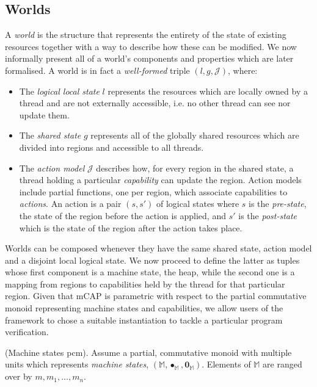 \subsection{Worlds} \label{worlds}

A \textit{world} is the structure that represents the entirety of the state of existing resources together with a way to describe how these can be modified. We now informally present all of a world's components and properties which are later formalised. A world is in fact a \textit{well-formed} triple $(l, g, \mathcal{J})$, where:
\begin{itemize}
	\item The \textit{logical local state} $l$ represents the resources which are locally owned by a thread and are not externally accessible, i.e. no other thread can see nor update them.
	\item The \textit{shared state} $g$ represents all of the globally shared resources which are divided into regions and accessible to all threads.
	\item The \textit{action model} $\mathcal{J}$ describes how, for every region in the shared state, a thread holding a particular \textit{capability} can update the region. Action models include partial functions, one per region, which associate capabilities to \textit{actions}. An action is a pair $(s, s')$ of logical states where $s$ is the \textit{pre-state}, the state of the region before the action is applied, and $s'$ is the \textit{post-state} which is the state of the region after the action takes place.
\end{itemize}

Worlds can be composed whenever they have the same shared state, action model and a disjoint local logical state. We now proceed to define the latter as tuples whose first component is a machine state, the heap, while the second one is a mapping from regions to capabilities held by the thread for that particular region. Given that mCAP is parametric with respect to the partial commutative monoid representing machine states and capabilities, we allow users of the framework to chose a suitable instantiation to tackle a particular program verification.

\begin{param}
	(Machine states pcm).
	Assume a partial, commutative monoid with multiple units which represents \emph{machine states}, $(\mathbb{M}, \bullet_\mathbb{M}, \mathbf{0}_\mathbb{M})$. Elements of $\mathbb{M}$ are ranged over by $m, m_1, \ldots, m_n$.
\end{param}

